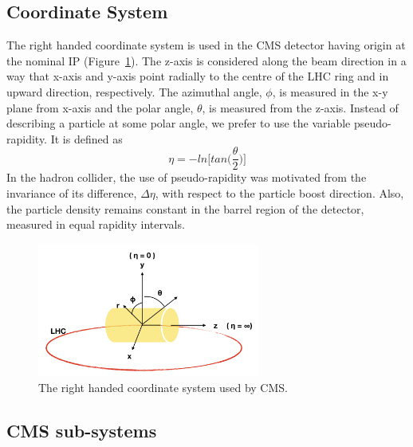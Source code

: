 \subsection{Coordinate System} %
\label{sub:coordinate_system}
The right handed coordinate system is used in the CMS detector having origin at the nominal IP (Figure~\ref{fig:cms-coordinate-system}). The z-axis is considered along the beam direction in a way that x-axis and y-axis point radially to the centre of the LHC ring and in upward direction, respectively. The azimuthal angle, $\phi$, is measured in the x-y plane from x-axis and the polar angle, $\theta$, is measured from the z-axis. Instead of describing a particle at some polar angle, we prefer to use the variable pseudo-rapidity. It is defined as 
\begin{equation}
	\eta = -ln\bigg[tan\Big(\frac{\theta}{2}\Big)\bigg]
\end{equation}
In the hadron collider, the use of pseudo-rapidity was motivated from the invariance of its difference, $\Delta \eta$, with respect to the particle boost direction. Also, the particle density remains constant in the barrel region of the detector, measured in equal rapidity intervals.

\begin{figure}[!htbp]
	\centering
	\includegraphics[width=0.65\textwidth]{figures/LHC/CMS-coordinate-system.png}
	\caption{The right handed coordinate system used by CMS.}
	\label{fig:cms-coordinate-system}
\end{figure}

\subsection{CMS sub-systems} %
\label{sub:cms_sub_systems}

